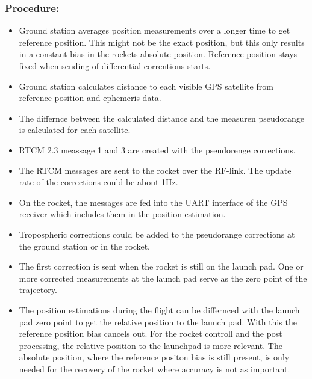 \subsubsection{Procedure:}
\begin{itemize}
 \item Ground station averages position measurements over a longer time to get reference position. 
 This might not be the exact position, but this only results in a constant bias in the rockets absolute position. 
 Reference position stays fixed when sending of differential correntions starts.
 
 \item Ground station calculates distance to each visible GPS satellite from reference position and ephemeris data.
 
 \item The differnce between the calculated distance and the measuren pseudorange is calculated for each satellite.
 
 \item RTCM 2.3 meassage 1 and 3 are created with the pseudorenge corrections.
 
 \item The RTCM messages are sent to the rocket over the RF-link. 
 The update rate of the corrections could be about 1Hz.
 
 \item On the rocket, the messages are fed into the UART interface of the GPS receiver which includes them in the position estimation.
 
 \item Tropospheric corrections could be added to the pseudorange corrections at the ground station or in the rocket.
 
 \item The first correction is sent when the rocket is still on the launch pad.
 One or more corrected measurements at the launch pad serve as the zero point of the trajectory.
 
 \item The position estimations during the flight can be differnced with the launch pad zero point to get the relative position to the launch pad.
 With this the reference position bias cancels out.
 For the rocket controll and the post processing, the relative position to the launchpad is more relevant.
 The absolute position, where the reference positon bias is still present, is only needed for the recovery of the rocket where accuracy is not as important.
\end{itemize}